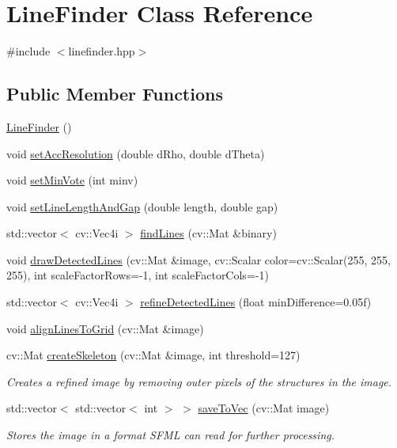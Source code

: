\hypertarget{classLineFinder}{\section{Line\-Finder Class Reference}
\label{classLineFinder}
}


{\ttfamily \#include $<$linefinder.\-hpp$>$}

\subsection*{Public Member Functions}
\begin{DoxyCompactItemize}
\item 
\hyperlink{classLineFinder_ac9a83317df7ff3d74a9add150962e849}{Line\-Finder} ()
\item 
void \hyperlink{classLineFinder_a4ffb60e7c12143a6824b884239243da9}{set\-Acc\-Resolution} (double d\-Rho, double d\-Theta)
\item 
void \hyperlink{classLineFinder_af76de2e78cc28b37fd15652e2967e56b}{set\-Min\-Vote} (int minv)
\item 
void \hyperlink{classLineFinder_a7655dc9adfaca75ed92c585d226a60df}{set\-Line\-Length\-And\-Gap} (double length, double gap)
\item 
std\-::vector$<$ cv\-::\-Vec4i $>$ \hyperlink{classLineFinder_adb0567e29363788ba519cff1f1f6686d}{find\-Lines} (cv\-::\-Mat \&binary)
\item 
void \hyperlink{classLineFinder_aa20781cdf8620689b78c221d1f30371f}{draw\-Detected\-Lines} (cv\-::\-Mat \&image, cv\-::\-Scalar color=cv\-::\-Scalar(255, 255, 255), int scale\-Factor\-Rows=-\/1, int scale\-Factor\-Cols=-\/1)
\item 
std\-::vector$<$ cv\-::\-Vec4i $>$ \hyperlink{classLineFinder_a4fe5f72054ba400611549ea25c25904e}{refine\-Detected\-Lines} (float min\-Difference=0.\-05f)
\item 
void \hyperlink{classLineFinder_a7dbb0089ad37b33bdd904e1347775098}{align\-Lines\-To\-Grid} (cv\-::\-Mat \&image)
\item 
cv\-::\-Mat \hyperlink{classLineFinder_ad9aa51b43bb797b324305d3c89f5145f}{create\-Skeleton} (cv\-::\-Mat \&image, int threshold=127)
\begin{DoxyCompactList}\small\item\em Creates a refined image by removing outer pixels of the structures in the image. \end{DoxyCompactList}\item 
std\-::vector$<$ std\-::vector$<$ int $>$ $>$ \hyperlink{classLineFinder_ad2dfe1367c2dd671f23a49304fe5240b}{save\-To\-Vec} (cv\-::\-Mat image)
\begin{DoxyCompactList}\small\item\em Stores the image in a format S\-F\-M\-L can read for further processing. \end{DoxyCompactList}\end{DoxyCompactItemize}


